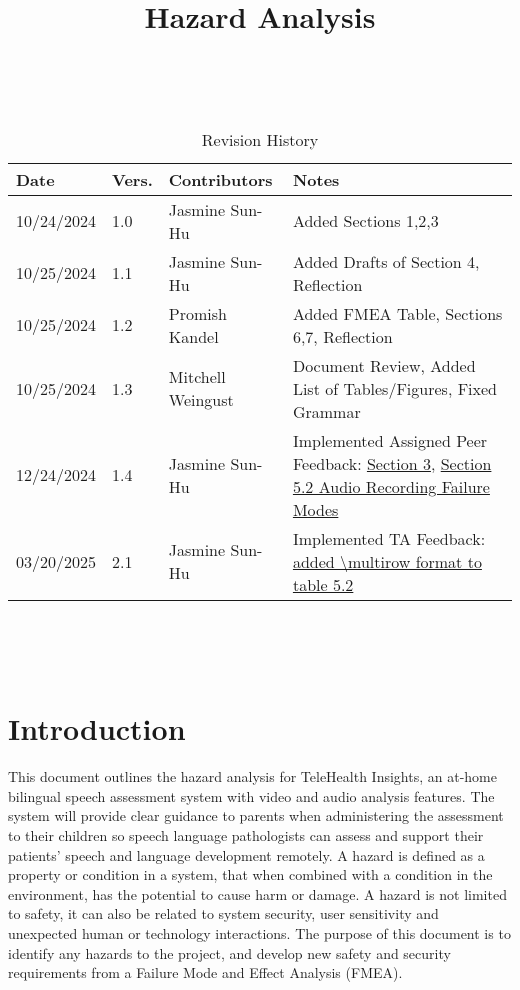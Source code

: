 \documentclass{article}
\title{Hazard Analysis\\\progname}
\author{\authname}
\date{}
\begin{document}
\maketitle
\thispagestyle{empty}

~\newpage


\begin{table}[hp]
\caption{Revision History} \label{TblRevisionHistory}
\begin{tabularx}{\textwidth}{p{1.5cm}p{1cm}p{3.5cm}X}
\toprule {\textbf{Date}} & {\textbf{Vers.}} & {\textbf{Contributors}} & {\textbf{Notes}}\\
\midrule
10/24/2024 & 1.0 & Jasmine Sun-Hu & Added Sections 1,2,3\\
10/25/2024 & 1.1 & Jasmine Sun-Hu & Added Drafts of Section 4, Reflection\\
10/25/2024 & 1.2 & Promish Kandel & Added FMEA Table, Sections 6,7, Reflection\\
10/25/2024 & 1.3 & Mitchell Weingust & Document Review, Added List of Tables/Figures, Fixed Grammar\\
12/24/2024 & 1.4 & Jasmine Sun-Hu & Implemented Assigned Peer Feedback: \href{https://github.com/parishanizam/TeleHealth/issues/131}{Section 3}, \href{https://github.com/parishanizam/TeleHealth/issues/157}{Section 5.2 Audio Recording Failure Modes}\\
03/20/2025 & 2.1 & Jasmine Sun-Hu & Implemented TA Feedback: \href{https://github.com/parishanizam/TeleHealth/issues/233}{added \textbackslash multirow format to table 5.2 }\\
\bottomrule
\end{tabularx}
\end{table}

~\newpage

\tableofcontents
\listoffigures
\listoftables

~\newpage


\section{Introduction}

\hspace{1.5em} This document outlines the hazard analysis for TeleHealth Insights, an at-home bilingual speech 
assessment system with video and audio analysis features. The system will provide clear guidance to
parents when administering the assessment to their children so speech language pathologists can assess and support
their patients' speech and language development remotely. A hazard is defined as a 
property or condition in a system, that when combined with a condition in the environment, has the potential to cause harm or 
damage. A hazard is not limited to safety, it can also be related to system security, user sensitivity and 
unexpected human or technology interactions. The purpose of this document is to identify any hazards to the project, and 
develop new safety and security requirements from a Failure Mode and Effect Analysis (FMEA).
\end{document}
